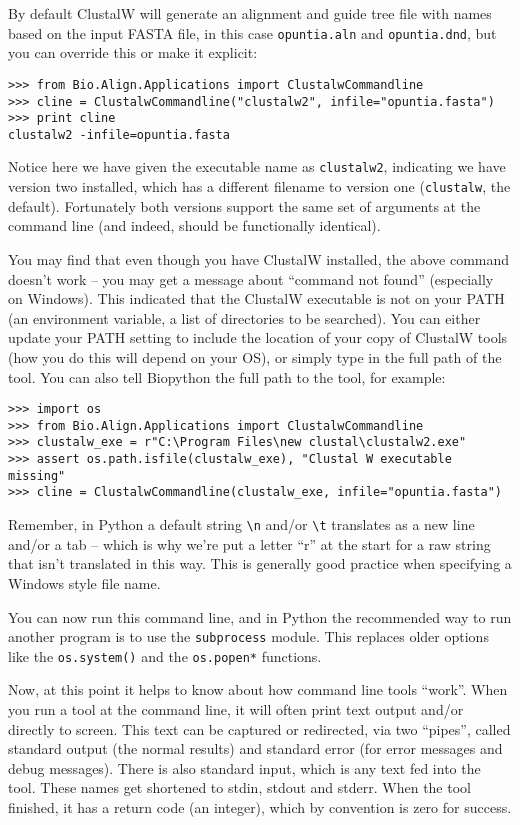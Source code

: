\documentclass{report}
\begin{document}
By default ClustalW will generate an alignment and guide tree file with names
based on the input FASTA file, in this case \texttt{opuntia.aln} and
\texttt{opuntia.dnd}, but you can override this or make it explicit:

\begin{verbatim}
>>> from Bio.Align.Applications import ClustalwCommandline
>>> cline = ClustalwCommandline("clustalw2", infile="opuntia.fasta")
>>> print cline
clustalw2 -infile=opuntia.fasta
\end{verbatim}

Notice here we have given the executable name as \texttt{clustalw2},
indicating we have version two installed, which has a different filename to
version one (\texttt{clustalw}, the default). Fortunately both versions
support the same set of arguments at the command line (and indeed, should be
functionally identical).

You may find that even though you have ClustalW installed, the above command
doesn't work -- you may get a message about ``command not found'' (especially
on Windows). This indicated that the ClustalW executable is not on your PATH
(an environment variable, a list of directories to be searched). You can
either update your PATH setting to include the location of your copy of
ClustalW tools (how you do this will depend on your OS), or simply type in
the full path of the tool. You can also tell Biopython the full
path to the tool, for example:

\begin{verbatim}
>>> import os
>>> from Bio.Align.Applications import ClustalwCommandline
>>> clustalw_exe = r"C:\Program Files\new clustal\clustalw2.exe"
>>> assert os.path.isfile(clustalw_exe), "Clustal W executable missing"
>>> cline = ClustalwCommandline(clustalw_exe, infile="opuntia.fasta")
\end{verbatim}

\noindent Remember, in Python a default string \verb|\n| and/or \verb|\t|
translates as a new line and/or a tab -- which is why we're put a letter
``r'' at the start for a raw string that isn't translated in this way.
This is generally good practice when specifying a Windows style file name.

You can now run this command line, and in Python the recommended way to
run another program is to use the \verb|subprocess| module. This replaces
older options like the \verb|os.system()| and the \verb|os.popen*| functions.

Now, at this point it helps to know about how command line tools ``work''.
When you run a tool at the command line, it will often print text output
and/or directly to screen. This text can be captured or redirected, via
two ``pipes'', called standard output (the normal results) and standard
error (for error messages and debug messages). There is also standard
input, which is any text fed into the tool. These names get shortened
to stdin, stdout and stderr. When the tool finished, it has a return
code (an integer), which by convention is zero for success.
\end{document}
